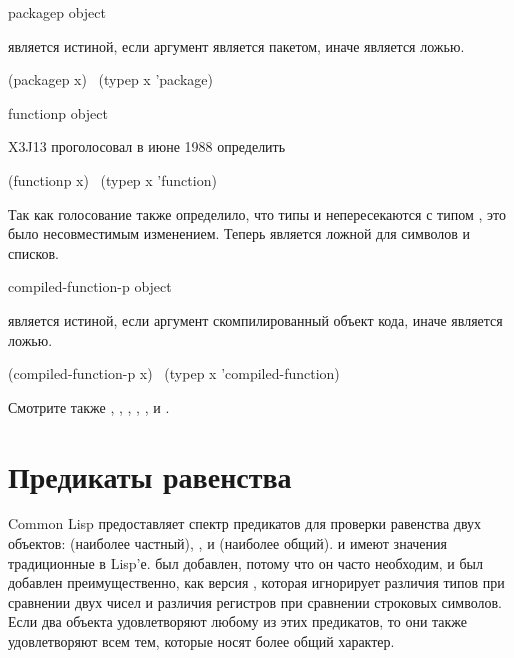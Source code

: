 \begin{defun}[Функция]
packagep object

 является истиной, если аргумент является пакетом, иначе является
ложью.
\begin{lisp}
(packagep x) \EQ\ (typep x 'package)
\end{lisp}
\end{defun}

\begin{defun}[Функция]
functionp object

\begin{newer}
X3J13 проголосовал в июне 1988 
определить
\begin{lisp}
(functionp x) \EQ\ (typep x 'function)
\end{lisp}
Так как голосование также определило, что типы  и 
непересекаются с типом , это было несовместимым изменением.
Теперь  является ложной для символов и списков.
\end{newer}
\end{defun}


\begin{defun}[Функция]
compiled-function-p object

 является истиной, если аргумент скомпилированный
объект кода,  иначе является ложью.
\begin{lisp}
(compiled-function-p x) \EQ\ (typep x 'compiled-function)
\end{lisp}
\end{defun}

Смотрите также , ,
, ,
,
 и .

\section{Предикаты равенства}

Common Lisp предоставляет спектр предикатов для проверки равенства двух
объектов:   (наиболее частный), ,  и 
(наиболее общий).  и  имеют значения традиционные в
Lisp'е.  был добавлен, потому что он часто необходим, и 
был добавлен преимущественно, как версия , которая игнорирует
различия типов при сравнении двух чисел и различия регистров при сравнении
строковых символов.
Если два объекта удовлетворяют любому из этих предикатов, то они
также удовлетворяют всем тем, которые носят более общий характер.

